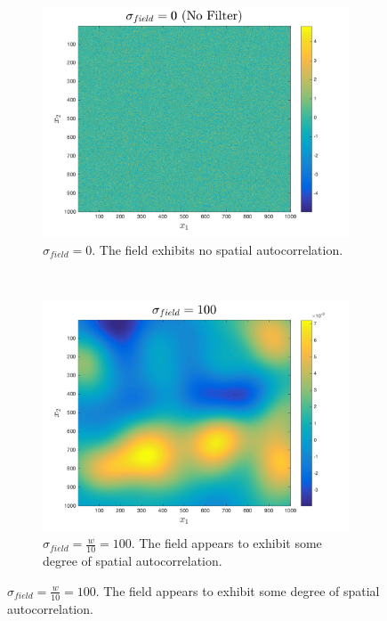 \begin{figure}[ht!]
    \centering
    \begin{subfigure}[t]{0.33333\textwidth}
        \centering
        \includegraphics[width=\linewidth]{figures/autocorr_sigma_0.png}
        \captionsetup{skip=0.25\baselineskip,size=footnotesize}
        \caption{$\sigma_{field} = 0$. The field exhibits no spatial autocorrelation.}
    \end{subfigure}%
    ~
    \begin{subfigure}[t]{0.33333\textwidth}
        \centering
        \includegraphics[width=\linewidth]{figures/autocorr_sigma_100.png}
        \captionsetup{skip=0.25\baselineskip,size=footnotesize}
        \caption{$\sigma_{field} = \frac{w}{10} = 100$. The field appears to exhibit some degree of spatial autocorrelation.}

\end{subfigure}
\end{figure}
